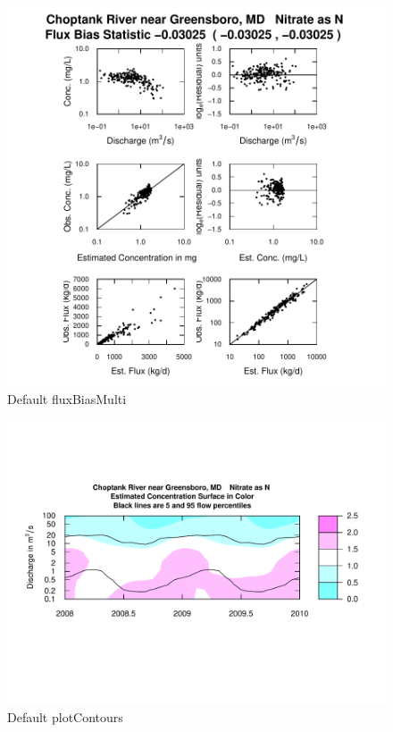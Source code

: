 \documentclass[a4paper,11pt]{article}
\begin{document}
\begin{figure}[htbp]
\begin{center}

\includegraphics{EGRET-figfluxBiasMulti}
\end{center}
\caption{Default fluxBiasMulti}
\label{fig:fluxBiasMulti}
\end{figure}












\begin{figure}[htbp]
\begin{center}

\includegraphics{EGRET-figplotContours}
\caption{Default plotContours}
\label{fig:plotContours}
\end{center}
\end{figure}
\end{document}
